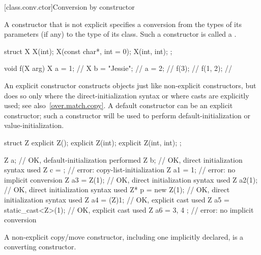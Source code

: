 [class.conv.ctor]{Conversion by constructor}%
%

\pnum
A constructor that is not explicit
specifies a conversion from
the types of its parameters (if any)
to the type of its class.
Such a constructor is called a
.
\begin{example}
%
\begin{codeblock}
struct X {
    X(int);
    X(const char*, int = 0);
    X(int, int);
};

void f(X arg) {
  X a = 1;          // 
  X b = "Jessie";   // 
  a = 2;            // 
  f(3);             // 
  f({1, 2});        // 
}
\end{codeblock}
\end{example}

\pnum
\begin{note}
An explicit constructor constructs objects just like non-explicit
constructors, but does so only where the direct-initialization syntax
or where casts are explicitly
used; see also~\ref{over.match.copy}.
A default constructor can be an explicit constructor; such a constructor
will be used to perform default-initialization
or value-initialization.
\begin{example}
\begin{codeblock}
struct Z {
  explicit Z();
  explicit Z(int);
  explicit Z(int, int);
};

Z a;                            // OK, default-initialization performed
Z b{};                          // OK, direct initialization syntax used
Z c = {};                       // error: copy-list-initialization
Z a1 = 1;                       // error: no implicit conversion
Z a3 = Z(1);                    // OK, direct initialization syntax used
Z a2(1);                        // OK, direct initialization syntax used
Z* p = new Z(1);                // OK, direct initialization syntax used
Z a4 = (Z)1;                    // OK, explicit cast used
Z a5 = static_cast<Z>(1);       // OK, explicit cast used
Z a6 = { 3, 4 };                // error: no implicit conversion
\end{codeblock}
\end{example}
\end{note}

\pnum
\begin{note}
A non-explicit copy/move constructor,
including one implicitly declared,
is a converting constructor.
\end{note}


